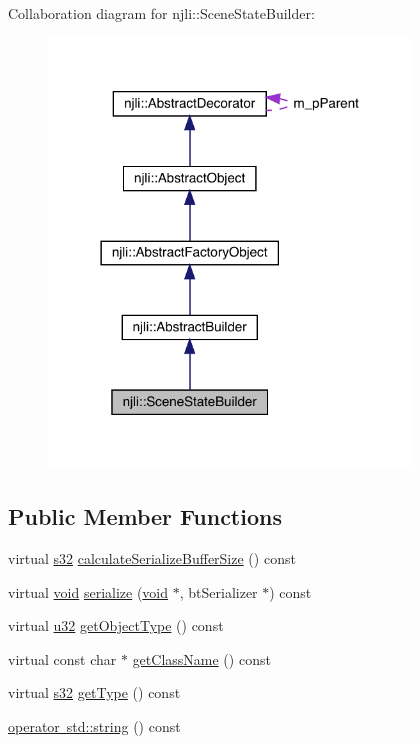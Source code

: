 Collaboration diagram for njli\+:\+:Scene\+State\+Builder\+:\nopagebreak
\begin{figure}[H]
\begin{center}
\leavevmode
\includegraphics[width=273pt]{classnjli_1_1_scene_state_builder__coll__graph}
\end{center}
\end{figure}
\subsection*{Public Member Functions}
\begin{DoxyCompactItemize}
\item 
virtual \mbox{\hyperlink{_util_8h_aa62c75d314a0d1f37f79c4b73b2292e2}{s32}} \mbox{\hyperlink{classnjli_1_1_scene_state_builder_acccc4d0f0b5b8b6a6e12c3eca9d48ffd}{calculate\+Serialize\+Buffer\+Size}} () const
\item 
virtual \mbox{\hyperlink{_thread_8h_af1e856da2e658414cb2456cb6f7ebc66}{void}} \mbox{\hyperlink{classnjli_1_1_scene_state_builder_a2aa348d593beb031fedb8012962c40da}{serialize}} (\mbox{\hyperlink{_thread_8h_af1e856da2e658414cb2456cb6f7ebc66}{void}} $\ast$, bt\+Serializer $\ast$) const
\item 
virtual \mbox{\hyperlink{_util_8h_a10e94b422ef0c20dcdec20d31a1f5049}{u32}} \mbox{\hyperlink{classnjli_1_1_scene_state_builder_adbb863f1a1d85cb5d8354462cb7fa5ae}{get\+Object\+Type}} () const
\item 
virtual const char $\ast$ \mbox{\hyperlink{classnjli_1_1_scene_state_builder_a6321171363bce444496fca0e11290835}{get\+Class\+Name}} () const
\item 
virtual \mbox{\hyperlink{_util_8h_aa62c75d314a0d1f37f79c4b73b2292e2}{s32}} \mbox{\hyperlink{classnjli_1_1_scene_state_builder_a6e8b777bc6877335f84bb06f0f568494}{get\+Type}} () const
\item 
\mbox{\hyperlink{classnjli_1_1_scene_state_builder_aa22041ffd1550b3f851d5439e8c588c7}{operator std\+::string}} () const
\end{DoxyCompactItemize}
